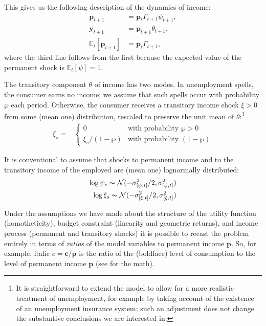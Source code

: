 \documentclass{article}
\newcommand{\cLvl}{\mathbf{c}}
\newcommand{\yLvl}{\mathbf{y}}
\newcommand{\pLvl}{\mathbf{p}}
\newcommand{\Ex}{\mathbb{E}}
\newcommand{\permGroFac}{\Gamma}
\newcommand{\permShk}{\psi}
\newcommand{\tranShk}{\theta}
\newcommand{\pZero}{\wp}
\newcommand{\tranShkEmp}{\xi}
\newcommand{\cNrm}{c}
\begin{document}
This gives us the following description of the dynamics of income:
\begin{align}
    \pLvl_{t+1} & = \pLvl_{t} \permGroFac_{t+1} \permShk_{t+1}, \\
    \yLvl_{t+1} & = \pLvl_{t+1} \tranShk_{t+1}, \\
    \Ex_{t}[\pLvl_{t+1}] & = \pLvl_{t} \permGroFac_{t+1},
\end{align}
where the third line follows from the first because the expected value of the permanent shock is $\Ex_{t}[\permShk]=1$.

The transitory component $\tranShk$ of income has two modes.
In unemployment spells, the consumer earns no income; we assume that such spells occur with probability $\pZero$ each period.
Otherwise, the consumer receives a transitory income shock $\xi > 0$ from some (mean one) distribution, rescaled to preserve the unit mean of $\tranShk$:\footnote{It is straightforward to extend the model to allow for a more realistic treatment of unemployment, for example by taking account of the existence of an unemployment insurance system; such an adjustment does not change the substantive conclusions we are interested in.}
\begin{align}
    \tranShkEmp_{s} = &
    \begin{cases}
        0\phantom{/\pZero} & \text{with probability $\pZero>0$}
        \\ \xi_{s}/(1-\pZero) & \text{with probability $(1-\pZero)$}
    \end{cases}
\end{align}

It is conventional to assume that shocks to permanent income and to the transitory income of the employed are (mean one) lognormally distributed:
\begin{align}
    \log \permShk_{s} \thicksim \mathcal{N}(-\sigma_{[\permShk, t]}^{2}/2,\sigma_{[\permShk, t]}^{2})
    \\ \log \xi_{s}\thicksim \mathcal{N}(-\sigma_{[\xi, t]}^{2}/2,\sigma_{[\xi, t]}^{2})
\end{align}


Under the assumptions we have made about the structure of the utility function (homotheticity), budget constraint (linearity and geometric returns), and income process (permanent and transitory shocks) it is possible to recast the problem entirely in terms of \textit{ratios} of the model variables to permanent income $\pLvl$.
So, for example, italic $\cNrm = \cLvl/\pLvl$ is the ratio of the (boldface) level of consumption to the level of permanent income $\pLvl$ (see \cite{BufferStockTheory} for the math).
\end{document}
